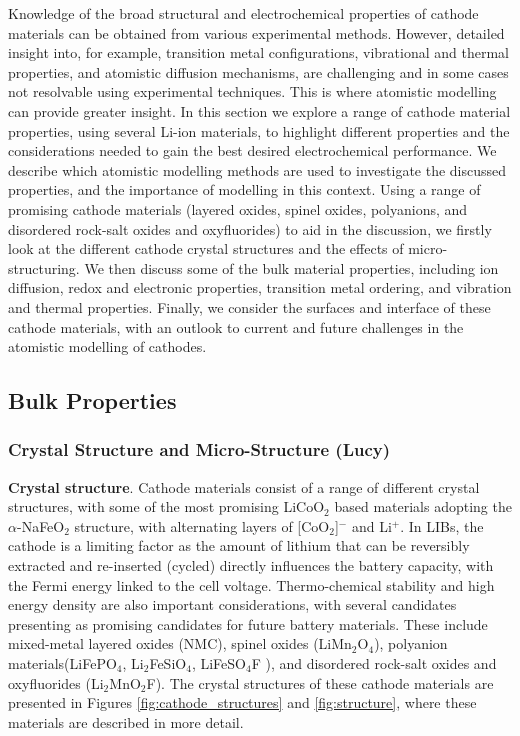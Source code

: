 \documentclass[../main.tex]{subfiles}
\begin{document}
Knowledge of the broad structural and electrochemical properties of cathode materials can be obtained from various experimental methods. However, detailed insight into, for example, transition metal configurations, vibrational and thermal properties, and atomistic diffusion mechanisms, are challenging and in some cases not resolvable using experimental techniques. This is where atomistic modelling can provide greater insight. In this section we explore a range of cathode material properties, using several Li-ion materials, to highlight different properties and the considerations needed to gain the best desired electrochemical performance. We describe which atomistic modelling methods are used to investigate the discussed properties, and the importance of modelling in this context. Using a range of promising cathode materials (layered oxides, spinel oxides, polyanions, and disordered rock-salt oxides and oxyfluorides) to aid in the discussion, we firstly look at the different cathode crystal structures and the effects of micro-structuring. We then discuss some of the bulk material properties, including ion diffusion, redox and electronic properties, transition metal ordering, and vibration and thermal properties. Finally, we consider the surfaces and interface of these cathode materials, with an outlook to current and future challenges in the atomistic modelling of cathodes.

\subsection{Bulk Properties}
\subsubsection{Crystal Structure and Micro-Structure (Lucy)}
\textbf{Crystal structure}. Cathode materials consist of a range of different crystal structures, with some of the most promising LiCoO$_2$ based materials adopting the $\alpha$-NaFeO$_2$ structure, with alternating layers of [CoO$_2$]$^-$ and Li$^+$. In LIBs, the cathode is a limiting factor as the amount of lithium that can be reversibly extracted and re-inserted (cycled) directly influences the battery capacity, with the Fermi energy linked to the cell voltage. \cite{islam2014lithium} Thermo-chemical stability and high energy density are also important considerations, with several candidates presenting as promising candidates for future battery materials. These include mixed-metal layered oxides (NMC), spinel oxides (LiMn$_2$O$_4$), polyanion materials(LiFePO$_4$, \cite{whittingham2008materials,masquelier2013polyanionic,goodenough_li-ion_2013, zaghib2013review} Li$_2$FeSiO$_4$, \cite{nyten2005electrochemical,sirisopanaporn2011polymorphism,islam2011silicate} LiFeSO$_4$F \cite{padhi1997mapping}), and disordered rock-salt oxides and oxyfluorides (Li$_2$MnO$_2$F\cite{Jacquet2019, clement2020, Chang2020, Tygesen2020, Sharpe2020}). The crystal structures of these cathode materials are presented in Figures \ref{fig:cathode_structures} and \ref{fig:structure}, where these materials are described in more detail.
\end{document}
